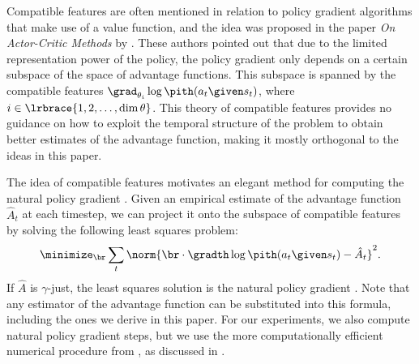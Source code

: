 \documentclass{article}
\newcommand{\hata}{\hat{A}}
\newcommand{\just}{$\gamma$-just}
\begin{document}
Compatible features are often mentioned in relation to policy gradient algorithms that make use of a value function, and the idea was proposed in the paper \textit{On Actor-Critic Methods} by \citet{konda2003onactor}.
These authors pointed out that due to the limited representation power of the policy, the policy gradient only depends on a certain subspace of the space of advantage functions.
This subspace is spanned by the compatible features $\gradthi \log \pith(a_t \given s_t)$, where $i \in \lrbrace{1,2,\dots,\dim \theta}$.
This  theory of compatible features provides no guidance on how to exploit the temporal structure of the problem to obtain better estimates of the advantage function, making it mostly orthogonal to the ideas in this paper.

The idea of compatible features motivates an elegant method for computing the natural policy gradient \citep{kakade2001natural,peters2008natural}.
Given an empirical estimate of the advantage function $\hata_t$ at each timestep, we can project it onto the subspace of compatible features by solving the following least squares problem:
\begin{align}
\minimize_{\br} \sum_t \norm{\br \cdot \gradth \log \pith(a_t \given s_t) - \hata_t}^2.
\end{align}
If $\hata$ is \just{}, the least squares solution is the natural policy gradient \citep{kakade2001natural}.
Note that any estimator of the advantage function can be substituted into this formula, including the ones we derive in this paper.
For our experiments, we also compute natural policy gradient steps, but we use the more computationally efficient numerical procedure from \cite{schulman2015trust}, as discussed in .
\end{document}

